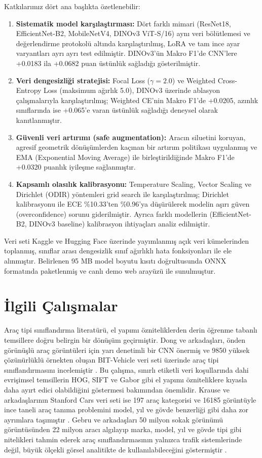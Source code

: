 \documentclass[conference]{IEEEtran}
\begin{document}
Katkılarımız dört ana başlıkta özetlenebilir:
\begin{enumerate}
\item \textbf{Sistematik model karşılaştırması:} Dört farklı mimari (ResNet18, EfficientNet-B2, MobileNetV4, DINOv3 ViT-S/16) aynı veri bölütlemesi ve değerlendirme protokolü altında karşılaştırılmış, LoRA ve tam ince ayar varyantları ayrı ayrı test edilmiştir. DINOv3'ün Makro F1'de CNN'lere +0.0183 ila +0.0682 puan üstünlük sağladığı gösterilmiştir.
\item \textbf{Veri dengesizliği stratejisi:} Focal Loss ($\gamma=2.0$) ve Weighted Cross-Entropy Loss (maksimum ağırlık 5.0), DINOv3 üzerinde ablasyon çalışmalarıyla karşılaştırılmış; Weighted CE'nin Makro F1'de +0.0205, azınlık sınıflarında ise +0.065'e varan üstünlük sağladığı deneysel olarak kanıtlanmıştır.
\item \textbf{Güvenli veri artırımı (safe augmentation):} Aracın siluetini koruyan, agresif geometrik dönüşümlerden kaçınan bir artırım politikası uygulanmış ve EMA (Exponential Moving Average) ile birleştirildiğinde Makro F1'de +0.0320 puanlık iyileşme sağlanmıştır.
\item \textbf{Kapsamlı olasılık kalibrasyonu:} Temperature Scaling, Vector Scaling ve Dirichlet (ODIR) yöntemleri grid search ile karşılaştırılmış; Dirichlet kalibrasyonu ile ECE \%10.33'ten \%0.96'ya düşürülerek modelin aşırı güven (overconfidence) sorunu giderilmiştir. Ayrıca farklı modellerin (EfficientNet-B2, DINOv3 baseline) kalibrasyon ihtiyaçları analiz edilmiştir.
\end{enumerate}

Veri seti Kaggle ve Hugging Face üzerinde yayımlanmış açık veri kümelerinden toplanmış, sınıflar arası dengesizlik sınıf ağırlıklı hata fonksiyonları ile ele alınmıştır. Belirlenen 95 MB model boyutu kısıtı doğrultusunda ONNX formatında paketlenmiş ve canlı demo web arayüzü ile sunulmuştur.

\section{İlgili Çalışmalar}
Araç tipi sınıflandırma literatürü, el yapımı özniteliklerden derin öğrenme tabanlı temsillere doğru belirgin bir dönüşüm geçirmiştir. Dong ve arkadaşları, önden görünüşlü araç görüntüleri için yarı denetimli bir CNN önermiş ve 9850 yüksek çözünürlüklü örnekten oluşan BIT-Vehicle veri seti üzerinde araç tipi sınıflandırmasını incelemiştir \cite{dong2015vehicle}. Bu çalışma, sınırlı etiketli veri koşullarında dahi evrişimsel temsillerin HOG, SIFT ve Gabor gibi el yapımı özniteliklere kıyasla daha ayırt edici olabildiğini göstermesi bakımından önemlidir. Krause ve arkadaşlarının Stanford Cars veri seti ise 197 araç kategorisi ve 16185 görüntüyle ince taneli araç tanıma problemini model, yıl ve gövde benzerliği gibi daha zor ayrımlara taşımıştır \cite{krause2013cars}. Gebru ve arkadaşları 50 milyon sokak görünümü görüntüsünden 22 milyon aracı algılayıp marka, model, yıl ve gövde tipi gibi nitelikleri tahmin ederek araç sınıflandırmasının yalnızca trafik sistemlerinde değil, büyük ölçekli görsel analitikte de kullanılabileceğini göstermiştir \cite{gebru2017streetview}.
\end{document}

